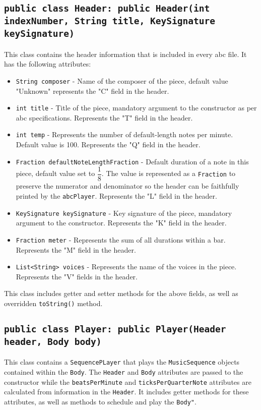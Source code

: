 \documentclass{article}
\begin{document}
\subsection*{{\tt public class Header: public Header(int indexNumber, String title, KeySignature keySignature)}}
This class contains the header information that is included in every abc file. It has the following attributes:
\begin{itemize}
\item {\tt String composer} - Name of the composer of the piece, default value "Unknown" represents the "C" field in the header.
\item {\tt int title} - Title of the piece, mandatory argument to the constructor as per abc specifications. Represents the "T" field in the header.
\item {\tt int temp} - Represents the number of default-length notes per minute. Default value is 100. Represents the "Q" field in the header.
\item {\tt Fraction defaultNoteLengthFraction} - Default duration of a note in this piece, default value set to $\dfrac{1}{8}$. The value is represented as a {\tt Fraction} to preserve the numerator and denominator so the header can be faithfully printed by the {\tt abcPlayer}. Represents the "L" field in the header.
\item {\tt KeySignature keySignature} - Key signature of the piece, mandatory argument to the constructor. Represents the "K" field in the header.
\item {\tt Fraction meter} - Represents the sum of all durations within a bar. Represents the "M" field in the header.
\item {\tt List<String> voices} - Represents the name of the voices in the piece. Represents the "V" fields in the header.
\end{itemize}
This class includes getter and setter methods for the above fields, as well as overridden {\tt toString()} method.

\subsection*{{\tt public class Player: public Player(Header header, Body body)}}
This class contains a {\tt SequencePLayer} that plays the {\tt MusicSequence} objects contained within the {\tt Body}. The {\tt Header} and {\tt Body} attributes are passed to the constructor while the {\tt beatsPerMinute} and {\tt ticksPerQuarterNote} attributes are calculated from information in the {\tt Header}. It includes getter methods for these attributes, as well as methods to schedule and play the {\tt Body"}.
\end{document}
